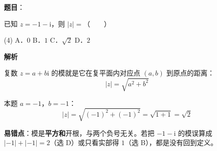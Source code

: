 \begin{answer}

\textbf{题目}：

已知 $z=-1-\mathrm i$，则 $|z|=$\mbox{（　　）}

\begin{gkopts}(4)
\task A．$0$
\task B．$1$
\task C．$\sqrt2$
\task D．$2$
\end{gkopts}

\textbf{解析}

复数 $z=a+b\mathrm i$ 的模就是它在复平面内对应点 $(a,b)$ 到原点的距离：
\nopagebreak[4]
\[|z|=\sqrt{a^{2}+b^{2}}\]

本题 $a=-1$，$b=-1$：
\nopagebreak[4]
\[|z|=\sqrt{(-1)^{2}+(-1)^{2}}=\sqrt{1+1}=\sqrt2\]

\begin{gktip}
\textbf{易错点}：模是\textbf{平方和}开根，与两个负号无关。若把 $-1-\mathrm i$ 的模误算成 $|-1|+|-1|=2$（选 D）或只看实部得 $1$（选 B），都是没有回到定义。
\end{gktip}


\par\medskip

\end{answer}
